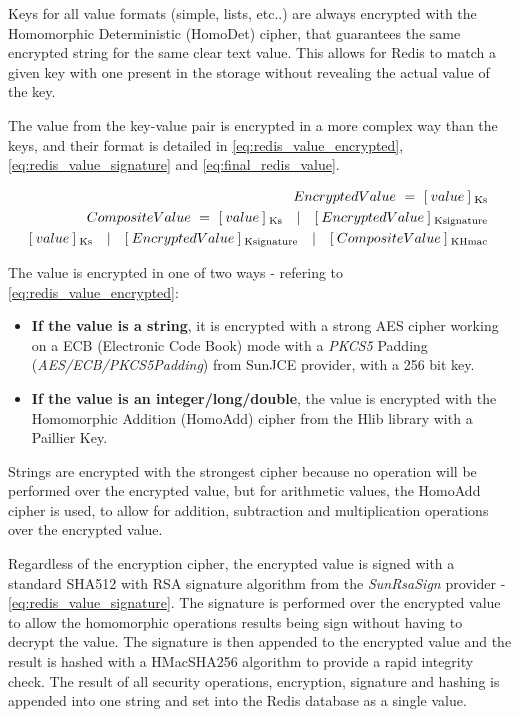 Keys for all value formats (simple, lists, etc..) are always encrypted with the Homomorphic Deterministic (HomoDet) cipher, that guarantees the same encrypted string for the same clear text value. This allows for Redis to match a given key with one present in the storage without revealing the actual value of the key.

The value from the key-value pair is encrypted in a more complex way than the keys, and their format is detailed in \ref{eq:redis_value_encrypted}, \ref{eq:redis_value_signature} and \ref{eq:final_redis_value}.

\begin{eqnarray}
EncryptedValue \  = \  [\: value \: ] \: \textsubscript{Ks} \label{eq:redis_value_encrypted} \\
CompositeValue \  = \  [\: value \: ] \: \textsubscript{Ks} \quad | \quad [\: EncryptedValue \: ] \: \textsubscript{Ksignature} \label{eq:redis_value_signature} \\
\![\: value \: ] \: \textsubscript{Ks} \quad | \quad [\: EncryptedValue \: ] \: \textsubscript{Ksignature} \quad | \quad [ \: CompositeValue \: ] \: \textsubscript{KHmac} \label{eq:final_redis_value}
\end{eqnarray}

The value is encrypted in one of two ways - refering to \ref{eq:redis_value_encrypted}:

\begin{itemize}
  \item \textbf{If the value is a string}, it is encrypted with a strong \gls{AES} cipher working on a \gls{ECB} (Electronic Code Book) mode with a \textit{PKCS5} Padding (\textit{AES/ECB/PKCS5Padding}) from SunJCE provider, with a 256 bit key.
  \item \textbf{If the value is an integer/long/double}, the value is encrypted with the Homomorphic Addition (HomoAdd) cipher from the Hlib library with a Paillier Key.
\end{itemize}

Strings are encrypted with the strongest cipher because no operation will be performed over the encrypted value, but for arithmetic values, the HomoAdd cipher is used, to allow for addition, subtraction and multiplication operations over the encrypted value.

Regardless of the encryption cipher, the encrypted value is signed with a standard SHA512 with \gls{RSA} signature algorithm from the \textit{SunRsaSign} provider - \ref{eq:redis_value_signature}. The signature is performed over the encrypted value to allow the homomorphic operations results being sign without having to decrypt the value. The signature is then appended to the encrypted value and the result is  hashed with a HMacSHA256 algorithm to provide a rapid integrity check. The result of all security operations, encryption, signature and hashing is appended into one string and set into the Redis database as a single value.

